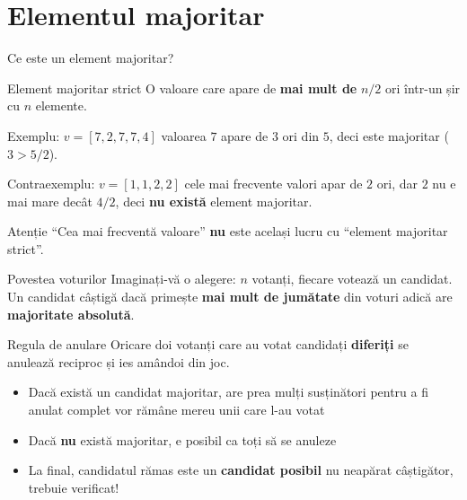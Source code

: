 \documentclass{beamer}
\begin{document}
\section{Elementul majoritar}

\begin{frame}{Ce este un element majoritar?}
  \begin{block}{Element majoritar strict}
    O valoare care apare de \textbf{mai mult de} $n/2$ ori într-un șir cu $n$ elemente.
  \end{block}

  \smallskip
  Exemplu: $v = [7, 2, 7, 7, 4]$ \textemdash{} valoarea $7$ apare de $3$ ori din $5$, deci este majoritar ($3 > 5/2$).

  \smallskip
  Contraexemplu: $v = [1, 1, 2, 2]$ \textemdash{} cele mai frecvente valori apar de $2$ ori, dar $2$ nu e mai mare decât $4/2$, deci \textbf{nu există} element majoritar.

  \smallskip
  \begin{block}{Atenție}
    ``Cea mai frecventă valoare'' \textbf{nu} este același lucru cu ``element majoritar strict''.
  \end{block}
\end{frame}

\begin{frame}{Povestea voturilor}
  Imaginați-vă o alegere: $n$ votanți, fiecare votează un candidat. Un candidat câștigă dacă primește \textbf{mai mult de jumătate} din voturi \textemdash{} adică are \textbf{majoritate absolută}.

  \smallskip
  \begin{block}{Regula de anulare}
    Oricare doi votanți care au votat candidați \textbf{diferiți} se anulează reciproc și ies amândoi din joc.
  \end{block}

  \smallskip
  \begin{itemize}
    \item Dacă există un candidat majoritar, are prea mulți susținători pentru a fi anulat complet \textemdash{} vor rămâne mereu unii care l-au votat
    \item Dacă \textbf{nu} există majoritar, e posibil ca toți să se anuleze
    \item La final, candidatul rămas este un \textbf{candidat posibil} \textemdash{} nu neapărat câștigător, trebuie verificat!
  \end{itemize}
\end{frame}
\end{document}
